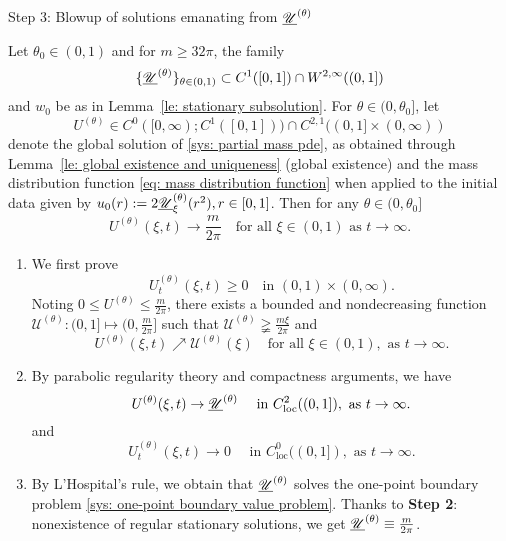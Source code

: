 \begin{frame}{Step 3: Blowup of solutions emanating from $\underline{\mathscr U}^{(\theta)}$}
\begin{lemma}\label{le: subsolution blow up}
	Let $\theta_0\in(0,1)$ and for $m \geqslant32\pi$, the family
\[
    \{\underline{\mathscr U}^{(\theta)}\}_{\theta\in(0,1)}\subset C^1([0, 1])\cap W^{2, \infty}((0, 1])
\]
and $w_0$ be as in Lemma~\ref{le: stationary subsolution}.
For $\theta\in (0, \theta_0]$, let
\[
    U^{(\theta)}\in C^0([0, \infty); C^1([0, 1])) \cap C^{2,1}((0, 1]\times(0, \infty))
\]
denote the global solution of \eqref{sys: partial mass pde},
as obtained through Lemma~\ref{le: global existence and uniqueness} (global existence) and the mass distribution function \eqref{eq: mass distribution function} when applied to the initial data given by $u_0(r) := 2\underline{\mathscr U}^{(\theta)}_\xi(r^2), r\in [0, 1]$.
	Then for any $\theta\in(0,\theta_0]$
	\begin{equation*}
		U^{(\theta)}(\xi, t) \rightarrow \frac{m}{2\pi}
        \quad\text {for all } \xi \in(0, 1) \text { as } t\to\infty.
	\end{equation*}
\end{lemma}
\end{frame}



\begin{frame}

\begin{enumerate}
  \item 	We first prove
	\begin{equation*}
U_t^{(\theta)}(\xi, t)\geqslant0 \quad\text{in } (0, 1)\times(0, \infty).
	\end{equation*}
Noting $0\leqslant U^{(\theta)} \leqslant \frac{m}{2\pi}$, there exists a bounded and nondecreasing function $\mathscr U^{(\theta)}:(0,1]\mapsto(0,\frac{m}{2\pi}]$ such that $\mathscr U^{(\theta)}\gneqq\frac{m\xi}{2\pi}$ and
\[
    U^{(\theta)}(\xi, t) \nearrow \mathscr U^{(\theta)}(\xi)
    \quad\text{for all } \xi\in(0,1), \text{ as }  t\to\infty.
\]
  \item By parabolic regularity theory and compactness arguments, we have 
      $$U^{(\theta)}(\xi, t) \to \underline{\mathscr U}^{(\theta)} \quad\text{ in } C^2_{\mathrm{loc}}((0, 1]), \text{ as }t\to\infty.$$ 
      and
      $$U^{(\theta)}_t(\xi, t) \to 0 \quad\text{ in } C^0_{\mathrm{loc}}((0, 1]), \text{ as }t\to\infty.$$ 
  \item By L'Hospital's rule, we obtain that $\underline{\mathscr U}^{(\theta)}$ solves the one-point boundary problem \eqref{sys: one-point boundary value problem}. Thanks to \textbf{Step 2}: nonexistence of regular stationary solutions, we get $\underline{\mathscr U}^{(\theta)}\equiv\frac{m}{2\pi}$.
\end{enumerate}
\end{frame}

